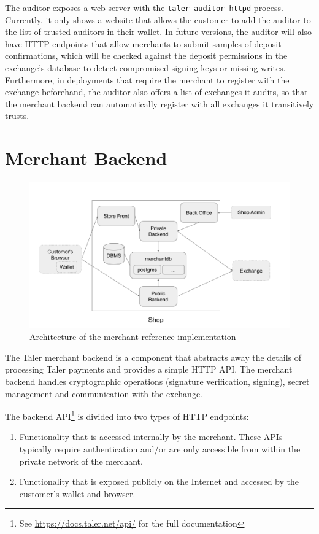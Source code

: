 The auditor exposes a web server with the \texttt{taler-auditor-httpd} process.
Currently, it only shows a website that allows the customer to add the auditor
to the list of trusted auditors in their wallet.  In future versions, the
auditor will also have HTTP endpoints that allow merchants to submit samples of
deposit confirmations, which will be checked against the deposit permissions in
the exchange's database to detect compromised signing keys or missing writes.
Furthermore, in deployments that require the merchant to register with the
exchange beforehand, the auditor also offers a list of exchanges it audits, so that
the merchant backend can automatically register with all exchanges it transitively trusts.

\section{Merchant Backend}
\begin{figure}
    \includegraphics[width=\textwidth]{diagrams/taler-diagram-merchant.png}
    \caption{Architecture of the merchant reference implementation}
\end{figure}

The Taler merchant backend is a component that abstracts away the details of
processing Taler payments and provides a simple HTTP API.  The merchant backend
handles cryptographic operations (signature verification, signing), secret
management and communication with the exchange.

The backend API\footnote{See \url{https://docs.taler.net/api/} for the full documentation}
is divided into two types of HTTP endpoints:
\begin{enumerate}
  \item Functionality that is accessed internally by the merchant.  These APIs typically
    require authentication and/or are only accessible from within the private
    network of the merchant.
  \item Functionality that is exposed publicly on the Internet and accessed by the customer's wallet and browser.
\end{enumerate}

